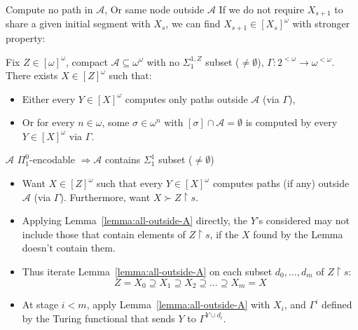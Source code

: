 \begin{frame}{Compute no path in $\mathcal{A}$, Or same node outside
$\mathcal{A}$}
  If we do not require $X_{s+1}$ to share a given initial segment with
  $X_s$, we can find $X_{s+1}\in[X_s]^\omega$ with stronger property:

  \begin{lemma}
  \label{lemma:all-outside-A}
    Fix $Z\in[\omega]^\omega$, compact
    $\mathcal{A}\subseteq\omega^\omega$ with no $\Sigma_1^{1,Z}$ subset
    ($\neq\emptyset$), $\Gamma:2^{<\omega} \rightarrow
    \omega^{<\omega}$. There exists $X\in[Z]^\omega$ such that:

    \begin{itemize}
      \item Either every $Y\in[X]^\omega$ computes only paths outside
        $\mathcal{A}$ (via $\Gamma$),
      \item Or for every $n\in\omega$, some $\sigma\in\omega^n$ with
        $[\sigma]\cap\mathcal{A}=\emptyset$ is computed by every
        $Y\in[X]^\omega$ via $\Gamma$.
    \end{itemize}
  \end{lemma}
\end{frame}

\begin{frame}{$\mathcal{A}$ $\Pi_1^0$-encodable $\Rightarrow \mathcal{A}$
contains $\Sigma_1^1$ subset ($\neq\emptyset$)}
  \begin{itemize}
    \item Want $X\in[Z]^\omega$ such that every $Y\in[X]^\omega$ computes
      paths (if any) outside $\mathcal{A}$ (via $\Gamma$). Furthermore,
      want $X\succ Z\restriction s$.
    \item Applying Lemma~\ref{lemma:all-outside-A} directly,
      the $Y$'s considered may not include those that contain elements of
      $Z\restriction s$, if the $X$ found by the Lemma doesn't contain
      them.
    \item Thus iterate Lemma~\ref{lemma:all-outside-A} on each subset
      $d_0,\ldots,d_m$ of $Z\restriction s$:
      \[Z=X_0 \supseteq X_1 \supseteq X_2 \supseteq\ldots \supseteq X_m=X\]
    \item At stage $i<m$, apply Lemma~\ref{lemma:all-outside-A} with $X_i$,
      and $\Gamma^i$ defined by the Turing functional that sends $Y$ to
      $\Gamma^{Y\cup d_i}$.
  \end{itemize}
\end{frame}

